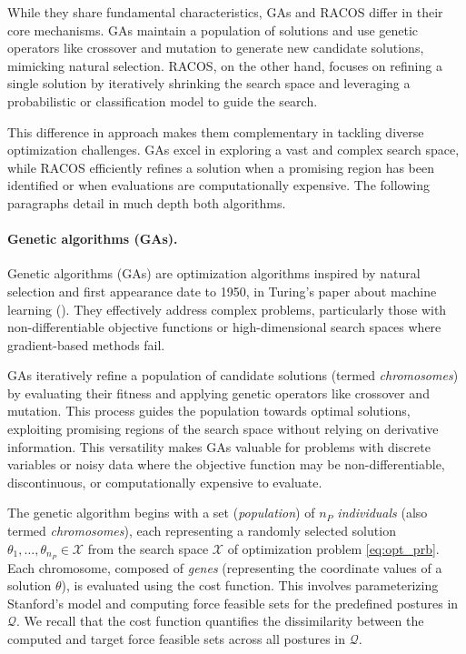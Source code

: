 While they share fundamental characteristics, GAs and RACOS differ in their core mechanisms. GAs maintain a population of solutions and use genetic operators like crossover and mutation to generate new candidate solutions, mimicking natural selection. RACOS, on the other hand, focuses on refining a single solution by iteratively shrinking the search space and leveraging a probabilistic or classification model to guide the search.

This difference in approach makes them complementary in tackling diverse optimization challenges. GAs excel in exploring a vast and complex search space, while RACOS efficiently refines a solution when a promising region has been identified or when evaluations are computationally expensive. The following paragraphs detail in much depth both algorithms.

\paragraph*{Genetic algorithms (GAs).}
Genetic algorithms (GAs) are optimization algorithms inspired by natural selection and first appearance date to 1950, in Turing's paper about machine learning (\cite{turingCOMPUTINGMACHINERYINTELLIGENCE1950}). They effectively address complex problems, particularly those with non-differentiable objective functions or high-dimensional search spaces where gradient-based methods fail. 

GAs iteratively refine a population of candidate solutions (termed \emph{chromosomes}) by evaluating their fitness and applying genetic operators like crossover and mutation. This process guides the population towards optimal solutions, exploiting promising regions of the search space without relying on derivative information. This versatility makes GAs valuable for problems with discrete variables or noisy data where the objective function may be non-differentiable, discontinuous, or computationally expensive to evaluate.

The genetic algorithm begins with a set (\emph{population}) of $n_P$ \emph{individuals} (also termed \emph{chromosomes}), each representing a randomly selected solution $\theta_1, \dots, \theta_{n_P} \in \mathcal{X}$ from the search space $\mathcal{X}$ of optimization problem \ref{eq:opt_prb}. Each chromosome, composed of \emph{genes} (representing the coordinate values of a solution $\theta$), is evaluated using the cost function. This involves parameterizing Stanford's model and computing force feasible sets for the predefined postures in $\mathcal{Q}$. We recall that the cost function quantifies the dissimilarity between the computed and target force feasible sets across all postures in $\mathcal{Q}$.

